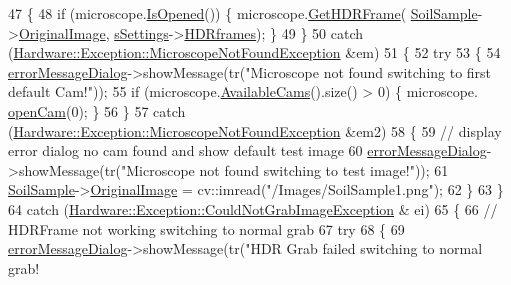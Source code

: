 \begin{DoxyCode}
47     \{
48         \textcolor{keywordflow}{if} (microscope.\hyperlink{class_hardware_1_1_microscope_ae799dbdff39787d3226e8e8ce25386de}{IsOpened}()) \{ microscope.\hyperlink{class_hardware_1_1_microscope_a8cec2eacbd3f0ea164d16100a6078d5b}{GetHDRFrame}(
      \hyperlink{class_v_s_a_g_u_i_ac90517c9baea0a75455d43d5eb77d3e7}{SoilSample}->\hyperlink{class_soil_analyzer_1_1_sample_a0d6e6fca9e232a77329daf0b4b29c634}{OriginalImage}, \hyperlink{class_v_s_a_g_u_i_a4a0358d00aa3cb520a9a1321962b0d4d}{sSettings}->\hyperlink{class_soil_analyzer_1_1_soil_settings_a77e631ff44efe74762b5adaa2eb2cd11}{HDRframes});  \}
49     \}
50     \textcolor{keywordflow}{catch} (\hyperlink{class_hardware_1_1_exception_1_1_microscope_not_found_exception}{Hardware::Exception::MicroscopeNotFoundException}
       &em)
51     \{
52         \textcolor{keywordflow}{try}
53         \{
54             \hyperlink{class_v_s_a_g_u_i_af01408e987e5df2ce336ee8447841c1f}{errorMessageDialog}->showMessage(tr(\textcolor{stringliteral}{"Microscope not found switching to first
       default Cam!"}));
55             \textcolor{keywordflow}{if} (microscope.\hyperlink{class_hardware_1_1_microscope_a48c34d1597a9d90f61427cbd2a25bdb9}{AvailableCams}().size() > 0) \{ microscope.
      \hyperlink{class_hardware_1_1_microscope_abc753dfc72956ef7285d0e373fb7e1f1}{openCam}(0); \}
56         \}
57         \textcolor{keywordflow}{catch} (\hyperlink{class_hardware_1_1_exception_1_1_microscope_not_found_exception}{Hardware::Exception::MicroscopeNotFoundException}
       &em2)
58         \{
59             \textcolor{comment}{// display error dialog no cam found and show default test image}
60             \hyperlink{class_v_s_a_g_u_i_af01408e987e5df2ce336ee8447841c1f}{errorMessageDialog}->showMessage(tr(\textcolor{stringliteral}{"Microscope not found switching to test
       image!"}));
61             \hyperlink{class_v_s_a_g_u_i_ac90517c9baea0a75455d43d5eb77d3e7}{SoilSample}->\hyperlink{class_soil_analyzer_1_1_sample_a0d6e6fca9e232a77329daf0b4b29c634}{OriginalImage} = cv::imread(\textcolor{stringliteral}{"/Images/SoilSample1.png"});
62         \}
63     \}
64     \textcolor{keywordflow}{catch} (\hyperlink{class_hardware_1_1_exception_1_1_could_not_grab_image_exception}{Hardware::Exception::CouldNotGrabImageException} &
      ei)
65     \{
66         \textcolor{comment}{// HDRFrame not working switching to normal grab}
67         \textcolor{keywordflow}{try}
68         \{
69             \hyperlink{class_v_s_a_g_u_i_af01408e987e5df2ce336ee8447841c1f}{errorMessageDialog}->showMessage(tr(\textcolor{stringliteral}{"HDR Grab failed switching to normal grab!
}
\end{DoxyCode}
